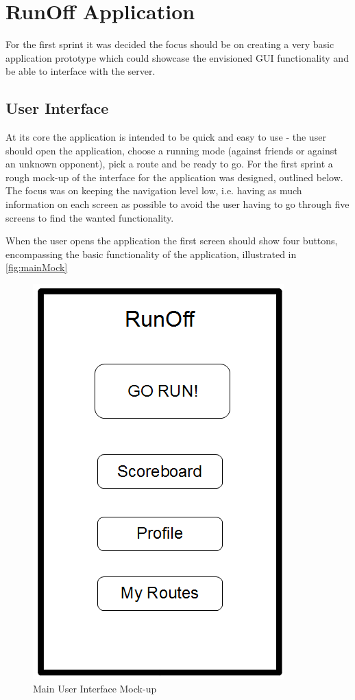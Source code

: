 \section{RunOff Application}
For the first sprint it was decided the focus should be on creating a very basic application prototype which could showcase the envisioned \ac{GUI} functionality and be able to interface with the server. 

\subsection{User Interface}
At its core the application is intended to be quick and easy to use - the user should open the application, choose a running mode (against friends or against an unknown opponent), pick a route and be ready to go. For the first sprint a rough mock-up of the interface for the application was designed, outlined below. The focus was on keeping the navigation level low, i.e. having as much information on each screen as possible to avoid the user having to go through five screens to find the wanted functionality.
\vspace{10pt}

When the user opens the application the first screen should show four buttons, encompassing the basic functionality of the application, illustrated in \autoref{fig:mainMock}


\begin{figure}[ht]
\begin{center}
 \caption{Main User Interface Mock-up}
 \label{fig:mainMock}
 \includegraphics[scale=0.4]{img/mainMockV1.png}
\end{center}
\end{figure}

